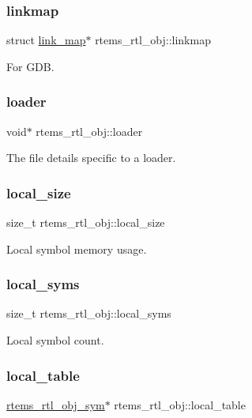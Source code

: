 \subsubsection{\texorpdfstring{linkmap}{linkmap}}
{\footnotesize\ttfamily struct \mbox{\hyperlink{structlink__map}{link\+\_\+map}}$\ast$ rtems\+\_\+rtl\+\_\+obj\+::linkmap}

For G\+DB. \mbox{\label{structrtems__rtl__obj_a744f505844745c100beb7a4b203d29b5}} 
\subsubsection{\texorpdfstring{loader}{loader}}
{\footnotesize\ttfamily void$\ast$ rtems\+\_\+rtl\+\_\+obj\+::loader}

The file details specific to a loader. \mbox{\label{structrtems__rtl__obj_aa4d97e646b905e86bb49a78ba5733e6c}} 
\subsubsection{\texorpdfstring{local\_size}{local\_size}}
{\footnotesize\ttfamily size\+\_\+t rtems\+\_\+rtl\+\_\+obj\+::local\+\_\+size}

Local symbol memory usage. \mbox{\label{structrtems__rtl__obj_a33e427378e1536775de7d09aab7a3a66}} 
\subsubsection{\texorpdfstring{local\_syms}{local\_syms}}
{\footnotesize\ttfamily size\+\_\+t rtems\+\_\+rtl\+\_\+obj\+::local\+\_\+syms}

Local symbol count. \mbox{\label{structrtems__rtl__obj_ac50c44399c53ae4ebf1e3bf86d141b8c}} 
\subsubsection{\texorpdfstring{local\_table}{local\_table}}
{\footnotesize\ttfamily \mbox{\hyperlink{structrtems__rtl__obj__sym}{rtems\+\_\+rtl\+\_\+obj\+\_\+sym}}$\ast$ rtems\+\_\+rtl\+\_\+obj\+::local\+\_\+table}

